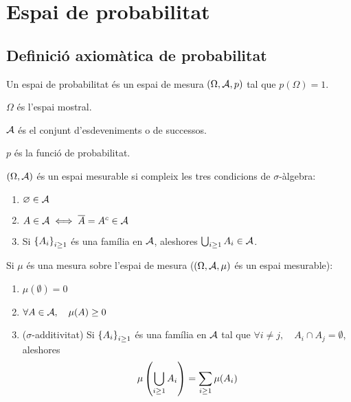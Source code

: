 \chapter{Espai de probabilitat}

\section{Definició axiomàtica de probabilitat}

\begin{defi}
    Un espai de probabilitat és un espai de mesura $(\Omega,\mathcal{A}, p)$ tal que $p(\Omega)=1$.
\end{defi}

\begin{defi}
    $\Omega$ és l'espai mostral.
\end{defi}

\begin{defi}
    $\mathcal{A}$ és el conjunt d'esdeveniments o de successos.
\end{defi}

\begin{defi}
    $p$ és la funció de probabilitat.
\end{defi}

\begin{obs}
    $(\Omega,\mathcal{A})$ és un espai mesurable si compleix les tres condicions de $\sigma$-àlgebra:
    \begin{enumerate}
        \item $\varnothing \in \mathcal{A}$
        \item $A \in \mathcal{A} \iff \overline{A} = A^c \in \mathcal{A}$
        \item Si $\left\{ A_i\right\} _{i\ge1}$ és una família en $\mathcal{A}$, aleshores $\bigcup_{i\ge1}{A_i} \in \mathcal{A}$.
    \end{enumerate}
    Si $\mu$ és una mesura sobre l'espai de mesura ($(\Omega,\mathcal{A},\mu)$ és un espai mesurable):
    \begin{enumerate}
        \item $\mu(\emptyset) = 0$
        \item $\forall A \in \mathcal{A},\quad \mu(A) \ge0$
        \item ($\sigma$-additivitat) Si $\left\{ A_i\right\}_{i\ge 1}$ és una família en $\mathcal{A}$ tal que $\forall i \neq j,\quad A_i \cap A_j = \emptyset$,
        aleshores \[\mu\left(\bigcup_{i\ge 1}{A_i}\right) = \sum_{i\ge1}{\mu(A_i)}\]
    \end{enumerate}
\end{obs}

